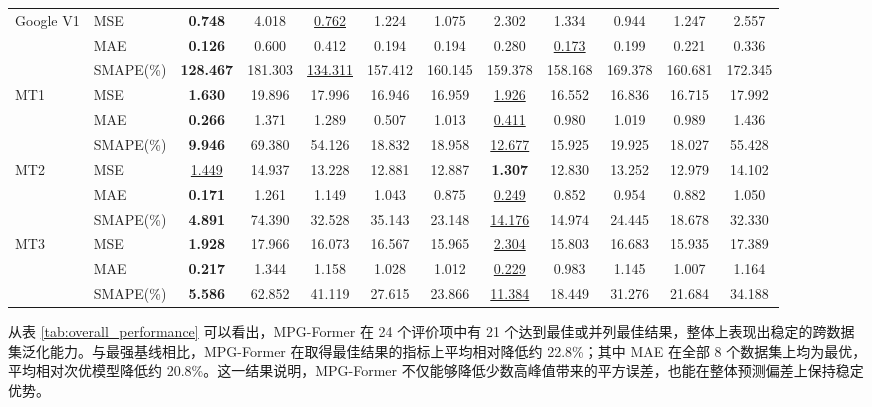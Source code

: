 \documentclass[UTF8]{ctexart}
\begin{document}
\begin{table}[t]
{\begin{tabular}{ll|cccccccccc}
\midrule
\multirow{3}{*}{Google V1} & MSE & \textbf{0.748} & 4.018 & \underline{0.762} & 1.224 & 1.075 & 2.302 & 1.334 & 0.944 & 1.247 & 2.557 \\
 & MAE & \textbf{0.126} & 0.600 & 0.412 & 0.194 & 0.194 & 0.280 & \underline{0.173} & 0.199 & 0.221 & 0.336 \\
 & SMAPE(\%) & \textbf{128.467} & 181.303 & \underline{134.311} & 157.412 & 160.145 & 159.378 & 158.168 & 169.378 & 160.681 & 172.345 \\
\midrule
\multirow{3}{*}{MT1} & MSE & \textbf{1.630} & 19.896 & 17.996 & 16.946 & 16.959 & \underline{1.926} & 16.552 & 16.836 & 16.715 & 17.992 \\
 & MAE & \textbf{0.266} & 1.371 & 1.289 & 0.507 & 1.013 & \underline{0.411} & 0.980 & 1.019 & 0.989 & 1.436 \\
 & SMAPE(\%) & \textbf{9.946} & 69.380 & 54.126 & 18.832 & 18.958 & \underline{12.677} & 15.925 & 19.925 & 18.027 & 55.428 \\
\midrule
\multirow{3}{*}{MT2} & MSE & \underline{1.449} & 14.937 & 13.228 & 12.881 & 12.887 & \textbf{1.307} & 12.830 & 13.252 & 12.979 & 14.102 \\
 & MAE & \textbf{0.171} & 1.261 & 1.149 & 1.043 & 0.875 & \underline{0.249} & 0.852 & 0.954 & 0.882 & 1.050 \\
 & SMAPE(\%) & \textbf{4.891} & 74.390 & 32.528 & 35.143 & 23.148 & \underline{14.176} & 14.974 & 24.445 & 18.678 & 32.330 \\
\midrule
\multirow{3}{*}{MT3} & MSE & \textbf{1.928} & 17.966 & 16.073 & 16.567 & 15.965 & \underline{2.304} & 15.803 & 16.683 & 15.935 & 17.389 \\
 & MAE & \textbf{0.217} & 1.344 & 1.158 & 1.028 & 1.012 & \underline{0.229} & 0.983 & 1.145 & 1.007 & 1.164 \\
 & SMAPE(\%) & \textbf{5.586} & 62.852 & 41.119 & 27.615 & 23.866 & \underline{11.384} & 18.449 & 31.276 & 21.684 & 34.188 \\
\bottomrule
\end{tabular}%
}
\end{table}

从表 \ref{tab:overall_performance} 可以看出，MPG-Former 在 24 个评价项中有 21 个达到最佳或并列最佳结果，整体上表现出稳定的跨数据集泛化能力。与最强基线相比，MPG-Former 在取得最佳结果的指标上平均相对降低约 22.8\%；其中 MAE 在全部 8 个数据集上均为最优，平均相对次优模型降低约 20.8\%。这一结果说明，MPG-Former 不仅能够降低少数高峰值带来的平方误差，也能在整体预测偏差上保持稳定优势。
\end{document}
